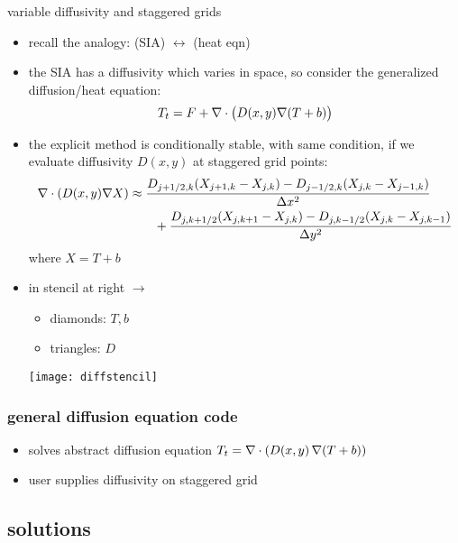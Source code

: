 \begin{frame}{variable diffusivity and staggered grids}

\begin{itemize}
  \item recall the analogy: \qquad (SIA) $\leftrightarrow$ (heat eqn)
  \item the SIA has a diffusivity which varies in space, so consider the generalized diffusion/heat equation:
     $$T_t = F + \nabla\cdot \big(D(x,y) \nabla (T+b)\big)$$
  \item the explicit method is conditionally stable, with same condition, if we evaluate diffusivity $D(x,y)$ at \alert{staggered} grid points:
  \small
\begin{align*}
\nabla\cdot \left(D(x,y) \nabla X\right) &\approx \frac{D_{j+1/2,k}(X_{j+1,k} - X_{j,k}) - D_{j-1/2,k}(X_{j,k} - X_{j-1,k})}{\Delta x^2} \\
	&\qquad + \frac{D_{j,k+1/2}(X_{j,k+1} - X_{j,k}) - D_{j,k-1/2}(X_{j,k} - X_{j,k-1})}{\Delta y^2}
\end{align*}
\normalsize
where $X=T+b$
\item in stencil at right $\longrightarrow$
    \begin{itemize}
    \item[] diamonds: $T,b$
    \item[] triangles: $D$
    \end{itemize}

\vspace{-15mm}
\hfill \texttt{[image: diffstencil]}
\end{itemize}
\end{frame}


\begin{frame}
  \frametitle{general diffusion equation code}


\small
\begin{itemize}
\item solves abstract diffusion equation $T_t = \nabla\cdot \left(D(x,y)\, \nabla (T+b)\right)$
\item user supplies diffusivity on staggered grid
\end{itemize}
\end{frame}


\subsection{solutions}

